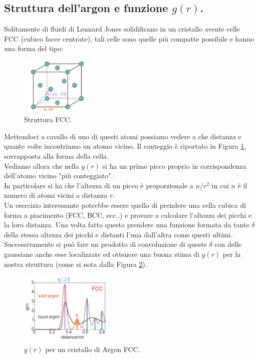 \subsection{Struttura dell'argon e funzione $g(r)$.}
\label{subsec:Struttura dell'argon e funzione $g(r)$.}
Solitamente di fluidi di Lennard Jones solidificano in un cristallo avente celle FCC (cubico facce centrate), tali celle sono quelle più compatte possibile e hanno una forma del tipo:
\begin{figure}[H]
	\centering
	\includegraphics[width=0.3\textwidth]{figures/FCC.png}
	\caption{Struttura FCC.}
	\label{fig:figures-FCC-png}
\end{figure}
\noindent
Mettendoci a cavallo di uno di questi atomi possiamo vedere a che distanza e quante volte incontriamo un atomo vicino. Il conteggio è riportato in Figura \ref{fig:figures-FCC-png}, sovrapposta alla forma della cella.\\
Vediamo allora che nella $g(r)$ si ha un primo picco proprio in corrispondenza dell'atomo vicino "più conteggiato". \\
In particolare si ha che l'altezza di un picco è proporzionale a $n/r^2$ in cui $n$ è il numero di atomi vicini a distanza $r$. \\
Un esercizio interessante potrebbe essere quello di prendere una cella cubica di forma a piacimento (FCC, BCC, ecc..) e provare a calcolare l'altezza dei picchi e la loro distanza.
Una volta fatto questo prendere una funzione formata da tante $\delta$ della stessa altezza dei picchi e distanti l'una dall'altra come questi ultimi. 
Successivamente si può fare un prodotto di convoluzione di queste $\delta$ con delle gaussiane anche esse localizzate ed ottenere una buona stima di $g(r)$ per la nostra struttura (come si nota dalla Figura \ref{fig:FCC-argon-plot}).\\
\begin{figure}[ht]
	\centering
	\includegraphics[width=0.4\textwidth]{figures/FCC-plot.png}
	\caption{$g(r)$ per un cristallo di Argon FCC.}
	\label{fig:FCC-argon-plot}
\end{figure}
